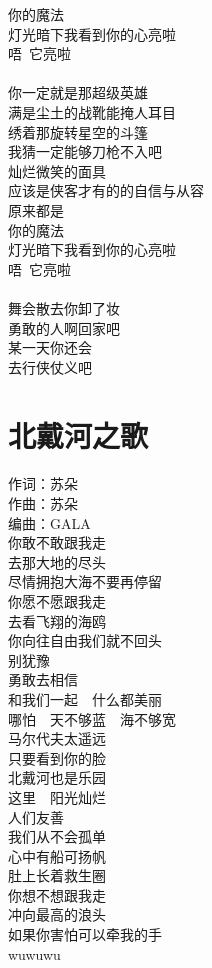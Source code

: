 \documentclass[twocolumn]{article}
\begin{document}
你的魔法\\
灯光暗下我看到你的心亮啦\\
唔~它亮啦\\\\
你一定就是那超级英雄\\
满是尘土的战靴能掩人耳目\\
绣着那旋转星空的斗篷\\
我猜一定能够刀枪不入吧\\
灿烂微笑的面具\\
应该是侠客才有的的自信与从容\\
原来都是\\
你的魔法\\
灯光暗下我看到你的心亮啦\\
唔~它亮啦\\
\\
舞会散去你卸了妆\\
勇敢的人啊回家吧\\
某一天你还会\\
去行侠仗义吧

\newpage
\section{北戴河之歌}
\noindent
{\kaishu
	作词：苏朵\\
	作曲：苏朵\\
	编曲：GALA\\
}
你敢不敢跟我走\\
去那大地的尽头\\
尽情拥抱大海不要再停留\\
你愿不愿跟我走\\
去看飞翔的海鸥\\
你向往自由我们就不回头\\
别犹豫\\
勇敢去相信\\
和我们一起~~什么都美丽\\
哪怕~~天不够蓝~~海不够宽\\
马尔代夫太遥远\\
只要看到你的脸\\
北戴河也是乐园\\
这里~~阳光灿烂\\
人们友善\\
我们从不会孤单\\
心中有船可扬帆\\
肚上长着救生圈\\
你想不想跟我走\\
冲向最高的浪头\\
如果你害怕可以牵我的手\\
wuwuwu
\end{document}
